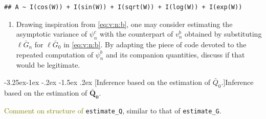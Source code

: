 \documentclass[]{article}
\makeatletter
\newenvironment{Shaded}{\begin{snugshade}}{\end{snugshade}}
\newcommand{\ControlFlowTok}[1]{\textcolor[rgb]{0.13,0.29,0.53}{\textbf{#1}}}
\newcommand{\DataTypeTok}[1]{\textcolor[rgb]{0.13,0.29,0.53}{#1}}
\newcommand{\KeywordTok}[1]{\textcolor[rgb]{0.13,0.29,0.53}{\textbf{#1}}}
\newcommand{\NormalTok}[1]{#1}
\newcommand{\OperatorTok}[1]{\textcolor[rgb]{0.81,0.36,0.00}{\textbf{#1}}}
\newcommand{\OtherTok}[1]{\textcolor[rgb]{0.56,0.35,0.01}{#1}}
\newcommand{\StringTok}[1]{\textcolor[rgb]{0.31,0.60,0.02}{#1}}
\providecommand{\tightlist}{%
  \setlength{\itemsep}{0pt}\setlength{\parskip}{0pt}}
\renewcommand\subsection{\@startsection{subsection}{3}{\z@}%
                                     {-3.25ex\@plus -1ex \@minus -.2ex}%
                                     {-1.5ex \@plus .2ex}%
                                     {\normalfont\normalsize\bfseries}}
\newcommand{\Gbar}{\bar{G}}
\newcommand{\Qbar}{\bar{Q}}
\newcommand{\tcg}[1]{\textcolor{olive}{#1}}
\theoremstyle{definition}
\theoremstyle{definition}
\theoremstyle{definition}
\theoremstyle{remark}
\makeatother
\begin{document}
\begin{Shaded}
\end{Shaded}

\begin{verbatim}
## A ~ I(cos(W)) + I(sin(W)) + I(sqrt(W)) + I(log(W)) + I(exp(W))
\end{verbatim}

\begin{enumerate}
\def\labelenumi{\arabic{enumi}.}
\setcounter{enumi}{5}
\tightlist
\item
  \textdbend  Drawing inspiration from \eqref{eq:v:n:b}, one may
  consider estimating the asymptotic variance of \(\psi_{n}^{c}\) with
  the counterpart of \(v_{n}^{b}\) obtained by substituting
  \(\ell\Gbar_{n}\) for \(\ell\Gbar_{0}\) in \eqref{eq:v:n:b}. By
  adapting the piece of code devoted to the repeated computation of
  \(\psi_{n}^{b}\) and its companion quantities, discuss if that would
  be legitimate.
\end{enumerate}

\subsection[Inference based on the estimation of $\Qbar_{0}$.]{Inference based
on the estimation of $\boldsymbol{\Qbar_{0}}$.} 
\label{subsec:inf:Q0}

\tcg{Comment on structure of} \texttt{estimate\_Q}, similar to that of
\texttt{estimate\_G}.
\end{document}
